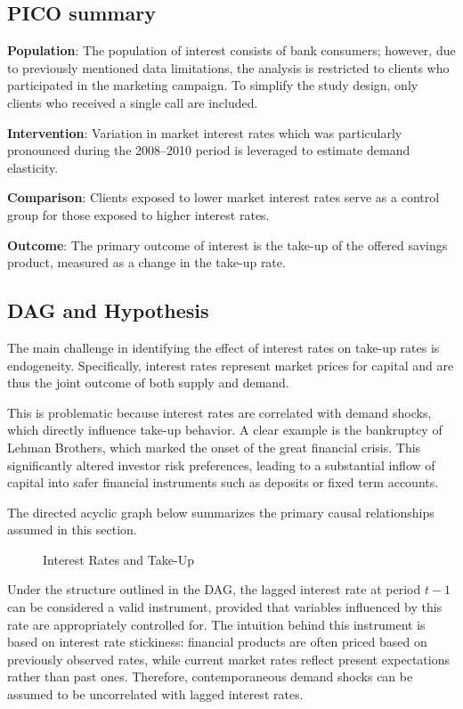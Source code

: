\documentclass[
  12pt,
]{article}
\begin{document}
\subsection{PICO summary}\label{pico-summary}

\textbf{Population}: The population of interest consists of bank
consumers; however, due to previously mentioned data limitations, the
analysis is restricted to clients who participated in the marketing
campaign. To simplify the study design, only clients who received a
single call are included.

\textbf{Intervention}: Variation in market interest rates which was
particularly pronounced during the 2008--2010 period is leveraged to
estimate demand elasticity.

\textbf{Comparison}: Clients exposed to lower market interest rates
serve as a control group for those exposed to higher interest rates.

\textbf{Outcome}: The primary outcome of interest is the take-up of the
offered savings product, measured as a change in the take-up rate.

\subsection{DAG and Hypothesis}\label{dag-and-hypothesis-2}

The main challenge in identifying the effect of interest rates on
take-up rates is endogeneity. Specifically, interest rates represent
market prices for capital and are thus the joint outcome of both supply
and demand.

This is problematic because interest rates are correlated with demand
shocks, which directly influence take-up behavior. A clear example is
the bankruptcy of Lehman Brothers, which marked the onset of the great
financial crisis. This significantly altered investor risk preferences,
leading to a substantial inflow of capital into safer financial
instruments such as deposits or fixed term accounts.

The directed acyclic graph below summarizes the primary causal
relationships assumed in this section.

\begin{figure}
\centering
\caption{Interest Rates and Take-Up}
\vspace{0.25cm}
\end{figure}
\vspace{-1cm}

Under the structure outlined in the DAG, the lagged interest rate at
period \(t-1\) can be considered a valid instrument, provided that
variables influenced by this rate are appropriately controlled for. The
intuition behind this instrument is based on interest rate stickiness:
financial products are often priced based on previously observed rates,
while current market rates reflect present expectations rather than past
ones. Therefore, contemporaneous demand shocks can be assumed to be
uncorrelated with lagged interest rates.
\end{document}
